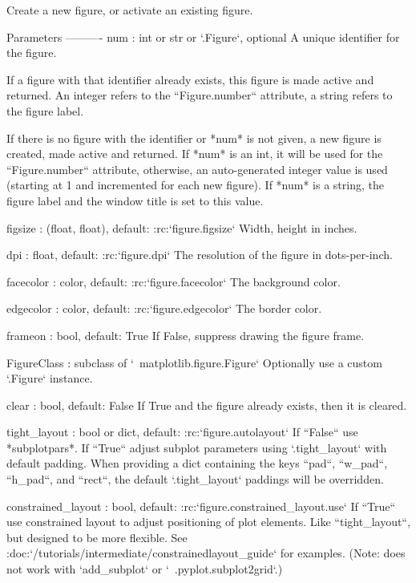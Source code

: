 \begin{DoxyVerb}Create a new figure, or activate an existing figure.

Parameters
----------
num : int or str or `.Figure`, optional
    A unique identifier for the figure.

    If a figure with that identifier already exists, this figure is made
    active and returned. An integer refers to the ``Figure.number``
    attribute, a string refers to the figure label.

    If there is no figure with the identifier or *num* is not given, a new
    figure is created, made active and returned.  If *num* is an int, it
    will be used for the ``Figure.number`` attribute, otherwise, an
    auto-generated integer value is used (starting at 1 and incremented
    for each new figure). If *num* is a string, the figure label and the
    window title is set to this value.

figsize : (float, float), default: :rc:`figure.figsize`
    Width, height in inches.

dpi : float, default: :rc:`figure.dpi`
    The resolution of the figure in dots-per-inch.

facecolor : color, default: :rc:`figure.facecolor`
    The background color.

edgecolor : color, default: :rc:`figure.edgecolor`
    The border color.

frameon : bool, default: True
    If False, suppress drawing the figure frame.

FigureClass : subclass of `~matplotlib.figure.Figure`
    Optionally use a custom `.Figure` instance.

clear : bool, default: False
    If True and the figure already exists, then it is cleared.

tight_layout : bool or dict, default: :rc:`figure.autolayout`
    If ``False`` use *subplotpars*. If ``True`` adjust subplot
    parameters using `.tight_layout` with default padding.
    When providing a dict containing the keys ``pad``, ``w_pad``,
    ``h_pad``, and ``rect``, the default `.tight_layout` paddings
    will be overridden.

constrained_layout : bool, default: :rc:`figure.constrained_layout.use`
    If ``True`` use constrained layout to adjust positioning of plot
    elements.  Like ``tight_layout``, but designed to be more
    flexible.  See
    :doc:`/tutorials/intermediate/constrainedlayout_guide`
    for examples.  (Note: does not work with `add_subplot` or
    `~.pyplot.subplot2grid`.)



\end{DoxyVerb}

